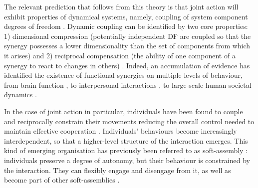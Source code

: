 \begin{CJK}{UTF8}{gbsn}
The relevant prediction that follows from this theory is that joint action will exhibit properties of dynamical systems, namely, coupling of system component degrees of freedom \citep{Turvey1978,Schmidt1990}.  Dynamic coupling can be identified by two core properties:  1) dimensional compression (potentially independent DF are coupled so that the synergy possesses a lower dimensionality than the set of components from which it arises) and 2) reciprocal compensation (the ability of one component of a synergy to react to changes in others) \citep{Riley2011}.  Indeed, an accumulation of evidence has identified the existence of functional synergies on multiple levels of behaviour, from brain function \citep{Yufik1998,Sengupta2013}, to interpersonal interactions \citep{Kelso2009,Riley2011,Fusaroli2014}, to large-scale human societal dynamics \citep{Nowak2017}.

In the case of joint action in particular, individuals have been found to couple and reciprocally constrain their movements reducing the overall control needed to maintain effective cooperation \citep{Ramenzoni2011,Ramenzoni2012,Riley2011,Schmidt1990}.  Individuals’ behaviours become increasingly interdependent, so that a higher-level structure of the interaction emerges. This kind of emerging organisation has previously been referred to as soft-assembly \citep{Kello2009}: individuals preserve a degree of autonomy, but their behaviour is constrained by the interaction. They can flexibly engage and disengage from it, as well as become part of other soft-assemblies \citep{DeJaegher2010,DiPaolo2012}.


\end{CJK}
